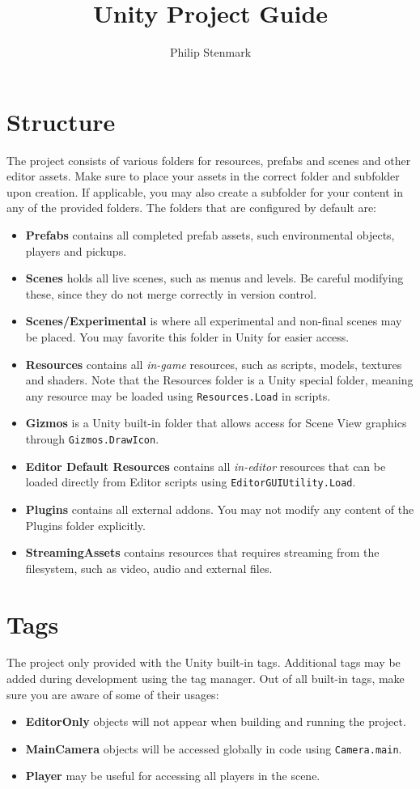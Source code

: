 \documentclass{article}
\title{Unity Project Guide}
\author{Philip Stenmark}
\begin{document}
\maketitle

\section{Structure}
The project consists of various folders for resources, prefabs and scenes and other editor assets. Make sure to place your assets in the correct folder and subfolder upon creation. If applicable, you may also create a subfolder for your content in any of the provided folders.
The folders that are configured by default are:
\begin{itemize}
\item \textbf{Prefabs} contains all completed prefab assets, such environmental objects, players and pickups.
\item \textbf{Scenes} holds all live scenes, such as menus and levels. Be careful modifying these, since they do not merge correctly in version control.
\item \textbf{Scenes/Experimental} is where all experimental and non-final scenes may be placed. You may favorite this folder in Unity for easier access.
\item \textbf{Resources} contains all \textit{in-game} resources, such as scripts, models, textures and shaders. Note that the Resources folder is a Unity special folder, meaning any resource may be loaded using \texttt{Resources.Load} in scripts.
\item \textbf{Gizmos} is a Unity built-in folder that allows access for Scene View graphics through \texttt{Gizmos.DrawIcon}.
\item \textbf{Editor Default Resources} contains all \textit{in-editor} resources that can be loaded directly from Editor scripts using \texttt{EditorGUIUtility.Load}.
\item \textbf{Plugins} contains all external addons. You may not modify any content of the Plugins folder explicitly.
\item \textbf{StreamingAssets} contains resources that requires streaming from the filesystem, such as video, audio and external files.
\end{itemize}

\section{Tags}
The project only provided with the Unity built-in tags. Additional tags may be added during development using the tag manager.
Out of all built-in tags, make sure you are aware of some of their usages:
\begin{itemize}
\item \textbf{EditorOnly} objects will not appear when building and running the project.
\item \textbf{MainCamera} objects will be accessed globally in code using \texttt{Camera.main}.
\item \textbf{Player} may be useful for accessing all players in the scene.
\end{itemize}
\end{document}
